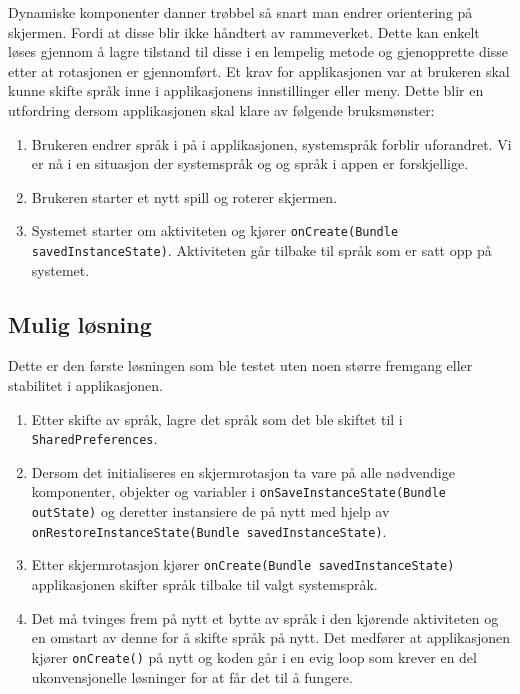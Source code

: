 Dynamiske komponenter danner trøbbel så snart man endrer orientering på skjermen. Fordi at disse blir ikke håndtert av rammeverket. Dette kan enkelt løses gjennom å lagre tilstand til disse i en lempelig metode og gjenopprette disse etter at rotasjonen er gjennomført. Et krav for applikasjonen var at brukeren skal kunne skifte språk inne i applikasjonens innstillinger eller meny. Dette blir en utfordring dersom applikasjonen skal klare av følgende bruksmønster:
\begin{enumerate}
\item Brukeren endrer språk i på i applikasjonen, systemspråk forblir uforandret. Vi er nå i en situasjon der systemspråk og og språk i appen er forskjellige. 
\item Brukeren starter et nytt spill og roterer skjermen. 
\item Systemet starter om aktiviteten og kjører \texttt{onCreate(Bundle savedInstanceState)}. Aktiviteten går tilbake til språk som er satt opp på systemet. 
\end{enumerate}

\subsection{Mulig løsning}
Dette er den første løsningen som ble testet uten noen større fremgang eller stabilitet i applikasjonen. 
\begin{enumerate}
\item Etter skifte av språk, lagre det språk som det ble skiftet til i \texttt{SharedPreferences}.
\item Dersom det initialiseres en skjermrotasjon ta vare på alle nødvendige komponenter, objekter og variabler i \texttt{onSaveInstanceState(Bundle outState)} og deretter instansiere de på nytt med hjelp av \texttt{onRestoreInstanceState(Bundle savedInstanceState)}.
\item Etter skjermrotasjon kjører \texttt{onCreate(Bundle savedInstanceState)} applikasjonen skifter språk tilbake til valgt systemspråk. 
\item Det må tvinges frem på nytt et bytte av språk i den kjørende aktiviteten og en omstart av denne for å skifte språk på nytt. Det medfører at applikasjonen kjører \texttt{onCreate()} på nytt og koden går i en evig loop som krever en del ukonvensjonelle løsninger for at får det til å fungere. 
\end{enumerate}

